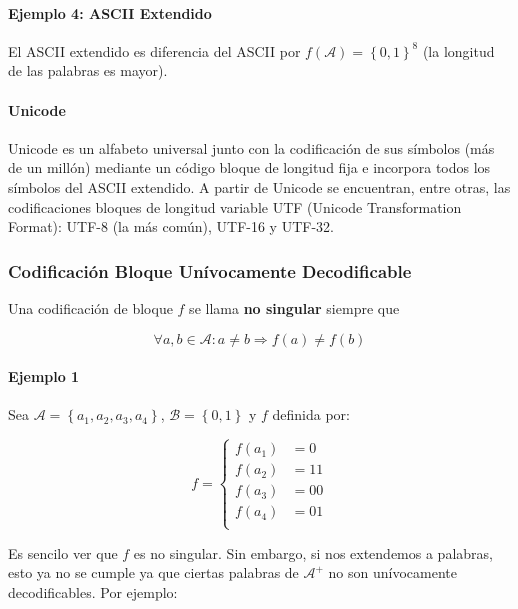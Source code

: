 \paragraph{Ejemplo 4: ASCII Extendido}\label{ejemplo-4-ascii-extendido}

El ASCII extendido es diferencia del ASCII por
\(f(\mathcal{A})=\left\{0,1\right\}^8\) (la longitud de las palabras es
mayor).

\paragraph{Unicode}\label{unicode}

Unicode es un alfabeto universal junto con la codificación de sus
símbolos (más de un millón) mediante un código bloque de longitud fija e
incorpora todos los símbolos del ASCII extendido. A partir de Unicode se
encuentran, entre otras, las codificaciones bloques de longitud variable
UTF (Unicode Transformation Format): UTF-8 (la más común), UTF-16 y
UTF-32.

\subsubsection{Codificación Bloque Unívocamente
Decodificable}\label{codificaciuxf3n-bloque-unuxedvocamente-decodificable}

Una codificación de bloque \(f\) se llama \textbf{no singular} siempre
que

\[
\forall a,b\in\mathcal{A}: a\neq b\Rightarrow f(a)\neq f(b)
\]

\paragraph{Ejemplo 1}\label{ejemplo-1-1-codigos}

Sea \(\mathcal{A} = \left\{a_1,a_2,a_3,a_4\right\}\), \(\mathcal{B} =
\left\{0,1\right\}\) y \(f\) definida por:

\[
f = \begin{cases}
f(a_1) &= 0\\
f(a_2) &= 11\\
f(a_3) &= 00\\
f(a_4) &= 01\\
\end{cases}
\]

Es sencilo ver que \(f\) es no singular. Sin embargo, si nos extendemos
a palabras, esto ya no se cumple ya que ciertas palabras de
\(\mathcal{A}^+\) no son unívocamente decodificables. Por ejemplo:

